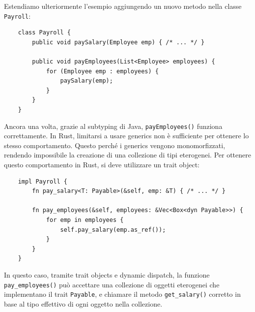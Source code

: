 Estendiamo ulteriormente l'esempio aggiungendo un nuovo metodo nella classe \texttt{Payroll}:
\begin{verbatim}
    class Payroll {
        public void paySalary(Employee emp) { /* ... */ }

        public void payEmployees(List<Employee> employees) {
            for (Employee emp : employees) {
                paySalary(emp);
            }
        }
    }
\end{verbatim}
Ancora una volta, grazie al subtyping di Java, \texttt{payEmployees()} funziona correttamente. In Rust, limitarsi a usare generics non è sufficiente per ottenere lo stesso comportamento. Questo perché i generics vengono monomorfizzati, rendendo impossibile la creazione di una collezione di tipi eterogenei. Per ottenere questo comportamento in Rust, si deve utilizzare un trait object:
\begin{verbatim}
    impl Payroll {
        fn pay_salary<T: Payable>(&self, emp: &T) { /* ... */ }

        fn pay_employees(&self, employees: &Vec<Box<dyn Payable>>) {
            for emp in employees {
                self.pay_salary(emp.as_ref());
            }
        }
    }
\end{verbatim}
In questo caso, tramite trait objects e dynamic dispatch, la funzione \texttt{pay\_employees()} può accettare una collezione di oggetti eterogenei che implementano il trait \texttt{Payable}, e chiamare il metodo \texttt{get\_salary()} corretto in base al tipo effettivo di ogni oggetto nella collezione. 

